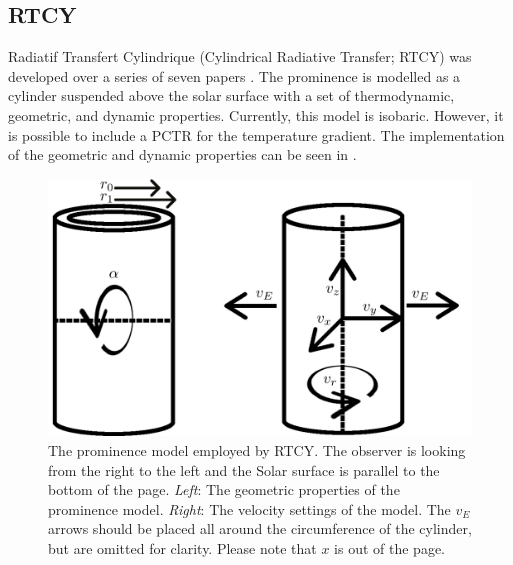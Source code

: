 \subsection{RTCY}
\label{rtcyintro}
Radiatif Transfert Cylindrique (Cylindrical Radiative Transfer; RTCY) was developed over a series of seven papers \citep{gouttebroze_radiative_2004,gouttebroze_radiative_2005,gouttebroze_radiative_2006,gouttebroze_radiative_2007, gouttebroze_radiative_2008, gouttebroze_radiative_2009,labrosse_radiative_2016}. The prominence is modelled as a cylinder suspended above the solar surface with a set of thermodynamic, geometric, and dynamic properties. Currently, this model is isobaric. However, it is possible to include a PCTR for the temperature gradient. The implementation of the geometric and dynamic properties can be seen in . 
\begin{figure}
    \centering
    \includegraphics[width=0.71\linewidth]{./03Modelling2D/figs/rtcy.png}
    \caption[The prominence model employed by RTCY.]{The prominence model employed by RTCY. The observer is looking from the right to the left and the Solar surface is parallel to the bottom of the page. \textit{Left}: The geometric properties of the prominence model.  \textit{Right}: The velocity settings of the model. The $v_E$ arrows should be placed all around the circumference of the cylinder, but are omitted for clarity. Please note that $x$ is out of the page.}
    \label{fig:rtcyv5}
\end{figure}
